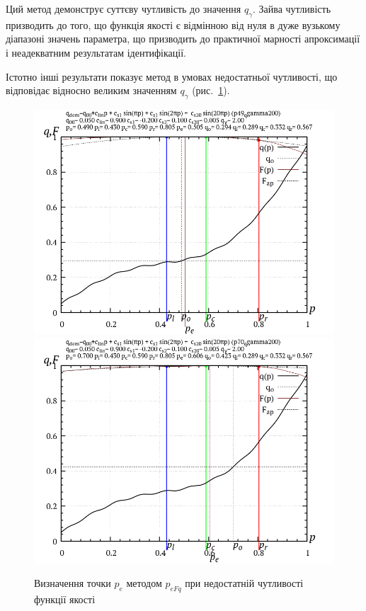 Ций метод демонструє суттєву чутливість до значення $q_\gamma$.
Зайва чутливість призводить до того, що функція якості є відмінною від нуля в
дуже вузькому діапазоні значень параметра, що призводить до практичної
марності апроксимації і неадекватним результатам
ідентифікації.

Істотно інші результати показує метод в умовах недостатньої
чутливості, що відповідає відносно великим значенням
$q_\gamma$ (рис.~\ref{atu:f:p_eFq_intra_200}).

\begin{figure}[htb!]
  \begin{center}
    \includegraphics[width=49\TW]{p/p_eFq/q_p_eFq_p49_qgamma200.png}
    \hfill
    \includegraphics[width=49\TW]{p/p_eFq/q_p_eFq_p70_qgamma200.png}
  \end{center}
  \caption{Визначення точки $p_e$ методом $p_{eFq}$ при недостатній чутливості функції якості}
  \label{atu:f:p_eFq_intra_200}
\end{figure}

